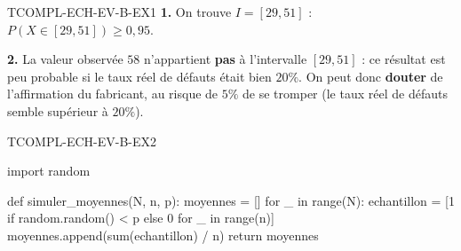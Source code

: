 %
%
\begin{corrige}{TCOMPL-ECH-EV-B-EX1}
\textbf{1.} On trouve $I=[29,51]$ : $P(X\in[29,51]) \geq 0{,}95$.

\textbf{2.} La valeur observée $58$ n'appartient \textbf{pas} à l'intervalle $[29,51]$ : ce résultat est peu probable si le taux réel de défauts était bien $20\%$. On peut donc \textbf{douter} de l'affirmation du fabricant, au risque de $5\%$ de se tromper (le taux réel de défauts semble supérieur à $20\%$).
\end{corrige}

\begin{corrige}{TCOMPL-ECH-EV-B-EX2}
\begin{python}
import random

def simuler_moyennes(N, n, p):
    moyennes = []
    for _ in range(N):
        echantillon = [1 if random.random() < p else 0 for _ in range(n)]
        moyennes.append(sum(echantillon) / n)
    return moyennes
\end{python}
\end{corrige}

